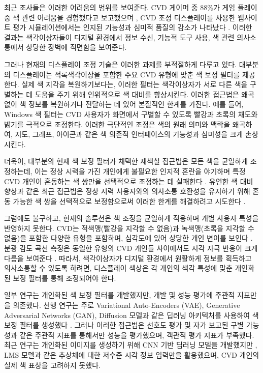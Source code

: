 \documentclass[12pt,a4paper]{article}
\begin{document}
최근 조사들은 이러한 어려움의 범위를 보여준다. CVD 게이머 중 88\%가 게임 플레이 중 색 관련 어려움을 경험했다고 보고했으며 \parencite{Mazur2025}, CVD 조정 디스플레이를 사용한 웹사이트 평가 시뮬레이션에서는 인지된 기능성과 심미적 품질의 감소가 나타났다 \parencite{Jamil2024}. 이러한 결과는 색각이상자들이 디지털 환경에서 정보 수신, 기능적 도구 사용, 색 관련 의사소통에서 상당한 장벽에 직면함을 보여준다.

그러나 현재의 디스플레이 조정 기술은 이러한 과제를 부적절하게 다루고 있다. 대부분의 디스플레이는 적록색각이상을 포함한 주요 CVD 유형에 맞춘 색 보정 필터를 제공한다. 실제 색 지각을 복원하기보다는, 이러한 필터는 색각이상자가 서로 다른 색을 구별하는 데 도움을 주기 위해 인위적으로 색 대비를 향상시킨다. 이러한 접근법은 왜곡 없이 색 정보를 복원하거나 전달하는 데 있어 본질적인 한계를 가진다. 예를 들어, Windows 색 필터는 CVD 사용자가 화면에서 구별할 수 있도록 빨강과 초록의 채도와 밝기를 극적으로 조정한다. 이러한 극단적인 조정은 색의 원래 의미와 맥락을 왜곡하여, 지도, 그래프, 아이콘과 같은 색 의존적 인터페이스의 기능성과 심미성을 크게 손상시킨다.

더욱이, 대부분의 현재 색 보정 필터가 채택한 재색칠 접근법은 모든 색을 균일하게 조정하는데, 이는 정상 시력을 가진 개인에게 불필요한 인지적 혼란을 야기하며 특정 CVD 개인이 혼동하는 색 쌍만을 선택적으로 조정하는 데 실패한다 \parencite{Choi2019}. 유연한 색 대비 향상과 같은 최근 접근법은 정상 시력 사용자와의 의사소통 호환성을 유지하기 위해 혼동 가능한 색 쌍을 선택적으로 보정함으로써 이러한 한계를 해결하려고 시도한다 \parencite{Hasson2019}.

그럼에도 불구하고, 현재의 솔루션은 색 조정을 균일하게 적용하며 개별 사용자 특성을 반영하지 못한다. CVD는 적색맹(빨강을 지각할 수 없음)과 녹색맹(초록을 지각할 수 없음)을 포함한 다양한 유형을 포함하며, 심각도에 있어 상당한 개인 변이를 보인다 \parencite{Khatri2019}. 분광 감도 곡선 측정은 동일한 유형의 CVD 개인들 사이에서도 시각 자극 반응이 크게 다름을 보여준다 \parencite{AdachiUsami1974}. 따라서, 색각이상자가 디지털 환경에서 원활하게 정보를 획득하고 의사소통할 수 있도록 하려면, 디스플레이 색상은 각 개인의 색각 특성에 맞춘 개인화된 보정 필터를 통해 조정되어야 한다.

일부 연구는 개인화된 색 보정 필터를 개발했지만, 개발 및 성능 평가에 주관적 지표만을 의존했다. 선행 연구는 주로 Variational Auto-Encoders (VAE), Generative Adversarial Networks (GAN), Diffusion 모델과 같은 딥러닝 아키텍처를 사용하여 색 보정 필터를 생성했다 \parencite{Gangwani2024}. 그러나 이러한 접근법은 선호도 평가 및 자가 보고된 구별 가능성과 같은 주관적 지표를 통해서만 성능을 평가했으며, 객관적 평가 지표가 부족했다. 최근 연구는 개인화된 이미지를 생성하기 위해 CNN 기반 딥러닝 모델을 개발했지만 \parencite{Jiang2023}, LMS 모델과 같은 추상체에 대한 저수준 시각 정보 입력만을 활용했으며, CVD 개인의 실제 색 표상을 고려하지 못했다.
\end{document}
